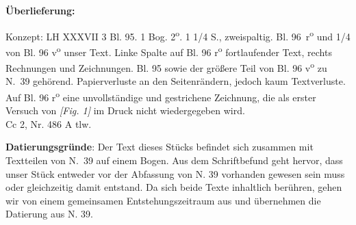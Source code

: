       
               
                \begin{ledgroupsized}[r]{120mm}
                \footnotesize 
                \pstart                
                \noindent\textbf{\"{U}berlieferung:}   
                \pend
                \end{ledgroupsized}
            
              
                            \begin{ledgroupsized}[r]{114mm}
                            \footnotesize 
                            \pstart \parindent -6mm
                            Konzept: LH XXXVII 3 Bl. 95. 1 Bog. 2\textsuperscript{o}. 1 1/4 S., zweispaltig. Bl. 96~r\textsuperscript{o}  und 1/4 von Bl. 96 v\textsuperscript{o} unser Text. Linke Spalte auf Bl. 96 r\textsuperscript{o} fortlaufender Text, rechts Rechnungen und Zeichnungen. Bl. 95 sowie der gr\"{o}ßere Teil von Bl. 96 v\textsuperscript{o} zu N.~39 geh\"{o}rend. Papierverluste an den Seitenr\"{a}ndern, jedoch kaum Textverluste. Auf Bl. 96 r\textsuperscript{o} eine unvollst\"{a}ndige und gestrichene Zeichnung, die als erster Versuch von \textit{[Fig. 1]} im Druck nicht wiedergegeben wird.\\Cc 2, Nr. 486 A tlw.\pend
                            \end{ledgroupsized}
                \vspace*{5mm}
                \begin{ledgroup}
                \footnotesize 
                \pstart
            \noindent\footnotesize{\textbf{Datierungsgr\"{u}nde}: Der Text dieses St\"{u}cks befindet sich zusammen mit Textteilen von N.~39 auf einem Bogen. Aus dem Schriftbefund geht hervor, dass unser St\"{u}ck entweder vor der Abfassung von N. 39 vorhanden gewesen sein muss oder gleichzeitig damit entstand. Da sich beide Texte inhaltlich ber\"{u}hren, gehen wir von einem gemeinsamen Entstehungszeitraum aus und \"{u}bernehmen die Datierung aus N. 39.}
                \pend
                \end{ledgroup}
            

